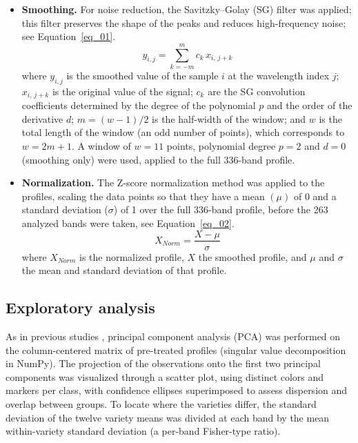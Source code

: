 \documentclass[final,5p,times,twocolumn]{elsarticle}
\begin{document}
\begin{itemize}
    \item \textbf{Smoothing.} For noise reduction, the Savitzky--Golay (SG) filter was applied; this filter preserves the shape of the peaks and reduces high-frequency noise; see Equation~\ref{eq_01}.
    \begin{equation}
        y_{i,j} = \sum_{k=-m}^{m} c_{k}\, x_{i,\,j+k}
        \label{eq_01}        
    \end{equation}
    where $y_{i,j}$ is the smoothed value of the sample $i$ at the wavelength index $j$; $x_{i,\,j+k}$ is the original value of the signal; $c_{k}$ are the SG convolution coefficients determined by the degree of the polynomial $p$ and the order of the derivative $d$; $m = (w-1)/2$ is the half-width of the window; and $w$ is the total length of the window (an odd number of points), which corresponds to $w = 2m + 1$. A window of $w=11$ points, polynomial degree $p=2$ and $d=0$ (smoothing only) were used, applied to the full 336-band profile.

    \item \textbf{Normalization.} The Z-score normalization method was applied to the profiles, scaling the data points so that they have a mean $(\mu)$ of 0 and a standard deviation ($\sigma$) of 1 over the full 336-band profile, before the 263 analyzed bands were taken, see Equation~\ref{eq_02}.
    \begin{equation}
        X_{Norm} = \frac{X-\mu}{\sigma}
        \label{eq_02}
    \end{equation}
     where $X_{Norm}$ is the normalized profile, $X$ the smoothed profile, and $\mu$ and $\sigma$ the mean and standard deviation of that profile.
\end{itemize}

\subsection{Exploratory analysis}

As in previous studies \citep{amigo2013,zhang2022,ali2024}, principal component analysis (PCA) was performed on the column-centered matrix of pre-treated profiles (singular value decomposition in NumPy).
The projection of the observations onto the first two principal components was visualized through a scatter plot, using distinct colors and markers per class, with confidence ellipses superimposed to assess dispersion and overlap between groups. 
To locate where the varieties differ, the standard deviation of the twelve variety means was divided at each band by the mean within-variety standard deviation (a per-band Fisher-type ratio).
\end{document}
